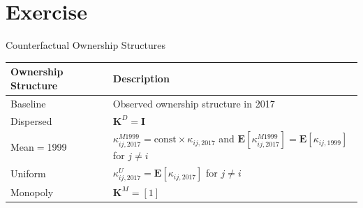 \documentclass[
  10pt, %
  aspectratio=169,  %
  handout
]{beamer}
\theoremstyle{plain}
\begin{document}
\section{Exercise}

\begin{frame}{Counterfactual Ownership Structures}
   \begin{table}[h]
    \centering
    \renewcommand{\arraystretch}{1.5} %
    \begin{tabular}{ll}
      \toprule
      Ownership Structure & Description \\
      \midrule
      Baseline            & Observed ownership structure in 2017 \\
      Dispersed           & $\boldsymbol{K}^D=\boldsymbol{I}$ \\
      Mean$=$1999         & $\kappa_{ij,2017}^{M1999}=\text{const}\times\kappa_{ij,2017}$ and $\boldsymbol{E}\left[\kappa_{ij,2017}^{M1999}\right]=\boldsymbol{E}\left[\kappa_{ij,1999}\right]$ for $j\neq i$\\
      Uniform             & $\kappa_{ij,2017}^U=\boldsymbol{E}\left[\kappa_{ij, 2017}\right]$ for $j\neq i$ \\
      Monopoly            & $\boldsymbol{K}^M=[1]$ \\
      \bottomrule
    \end{tabular}
    \renewcommand{\arraystretch}{1.0} %
    \end{table}
\end{frame}
\end{document}
